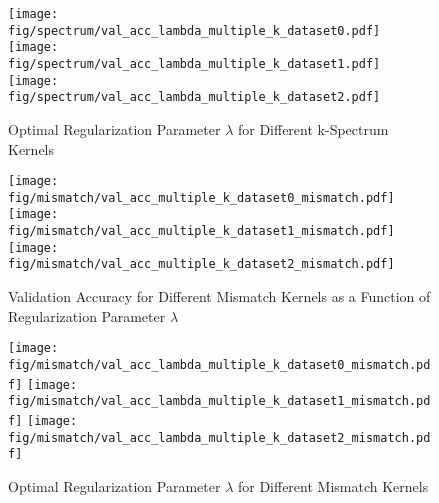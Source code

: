 \documentclass[final]{cvpr}
\begin{document}
	\newpage
	
	\begin{figure}[h!]
		\centering
		\texttt{[image: fig/spectrum/val\_acc\_lambda\_multiple\_k\_dataset0.pdf]}
		\texttt{[image: fig/spectrum/val\_acc\_lambda\_multiple\_k\_dataset1.pdf]}
		\texttt{[image: fig/spectrum/val\_acc\_lambda\_multiple\_k\_dataset2.pdf]}
		\caption{\centering Optimal Regularization Parameter $\lambda$ for Different k-Spectrum Kernels}
		\label{fig:lambda_spectrum}
	\end{figure}
	
	\begin{figure}[h!]
		\centering
		\texttt{[image: fig/mismatch/val\_acc\_multiple\_k\_dataset0\_mismatch.pdf]}
		\texttt{[image: fig/mismatch/val\_acc\_multiple\_k\_dataset1\_mismatch.pdf]}
		\texttt{[image: fig/mismatch/val\_acc\_multiple\_k\_dataset2\_mismatch.pdf]}
		\caption{\centering Validation Accuracy for Different Mismatch Kernels as a Function of Regularization Parameter $\lambda$}
		\label{fig:acc_mismatch}
	\end{figure}
	
	\newpage
	
	\begin{figure}[h!]
		\centering
		\texttt{[image: fig/mismatch/val\_acc\_lambda\_multiple\_k\_dataset0\_mismatch.pdf]}
		\texttt{[image: fig/mismatch/val\_acc\_lambda\_multiple\_k\_dataset1\_mismatch.pdf]}
		\texttt{[image: fig/mismatch/val\_acc\_lambda\_multiple\_k\_dataset2\_mismatch.pdf]}
		\caption{\centering Optimal Regularization Parameter $\lambda$ for Different Mismatch Kernels}
		\label{fig:lambda_mismatch}
	\end{figure}
		
\end{document}
